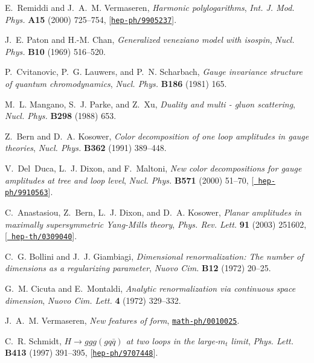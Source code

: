 \documentclass[paper,notoc,nohyper]{JHEP3}
\begin{document}
\begin{thebibliography}{10}
E.~Remiddi and J.~A.~M. Vermaseren, {\it Harmonic polylogarithms},  {\em Int.
  J. Mod. Phys.} {\bf A15} (2000) 725--754,
  [\href{http://xxx.lanl.gov/abs/hep-ph/9905237}{{\tt hep-ph/9905237}}].

J.~E. Paton and H.-M. Chan, {\it Generalized veneziano model with isospin},
  {\em Nucl. Phys.} {\bf B10} (1969) 516--520.

P.~Cvitanovic, P.~G. Lauwers, and P.~N. Scharbach, {\it Gauge invariance
  structure of quantum chromodynamics},  {\em Nucl. Phys.} {\bf B186} (1981)
  165.

M.~L. Mangano, S.~J. Parke, and Z.~Xu, {\it Duality and multi - gluon
  scattering},  {\em Nucl. Phys.} {\bf B298} (1988) 653.

Z.~Bern and D.~A. Kosower, {\it Color decomposition of one loop amplitudes in
  gauge theories},  {\em Nucl. Phys.} {\bf B362} (1991) 389--448.

V.~Del~Duca, L.~J. Dixon, and F.~Maltoni, {\it New color decompositions for
  gauge amplitudes at tree and loop level},  {\em Nucl. Phys.} {\bf B571}
  (2000) 51--70, [\href{http://xxx.lanl.gov/abs/hep-ph/9910563}{{\tt
  hep-ph/9910563}}].

C.~Anastasiou, Z.~Bern, L.~J. Dixon, and D.~A. Kosower, {\it Planar amplitudes
  in maximally supersymmetric {Y}ang-{M}ills theory},  {\em Phys. Rev. Lett.}
  {\bf 91} (2003) 251602, [\href{http://xxx.lanl.gov/abs/hep-th/0309040}{{\tt
  hep-th/0309040}}].

C.~G. Bollini and J.~J. Giambiagi, {\it Dimensional renormalization: The number
  of dimensions as a regularizing parameter},  {\em Nuovo Cim.} {\bf B12}
  (1972) 20--25.

G.~M. Cicuta and E.~Montaldi, {\it Analytic renormalization via continuous
  space dimension},  {\em Nuovo Cim. Lett.} {\bf 4} (1972) 329--332.

J.~A.~M. Vermaseren, {\it New features of form},
  \href{http://xxx.lanl.gov/abs/math-ph/0010025}{{\tt math-ph/0010025}}.

C.~R. Schmidt, {\it $H \to g g g (g q \bar q)$ at two loops in the large-$m_t$
  limit},  {\em Phys. Lett.} {\bf B413} (1997) 391--395,
  [\href{http://xxx.lanl.gov/abs/hep-ph/9707448}{{\tt hep-ph/9707448}}].

\end{thebibliography}\endgroup
\end{document}
